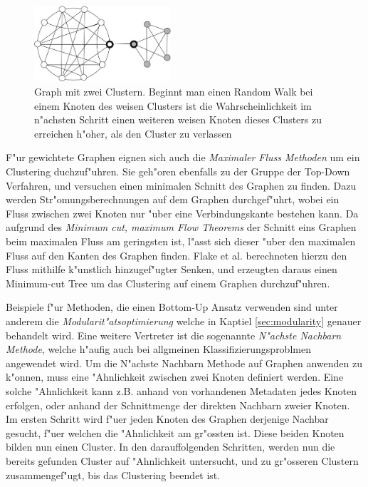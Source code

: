 \documentclass[journal]{vgtc}
\begin{document}
    \begin{figure}[h]
    \centering
    \includegraphics[width=2in]{images/random_walk}
    \caption{\label{fig:random_walk} Graph mit zwei Clustern. Beginnt man einen Random Walk bei einem Knoten des weisen Clusters
	      ist die Wahrscheinlichkeit im n"achsten Schritt einen weiteren weisen Knoten dieses Clusters zu erreichen h"oher,
	      als den Cluster zu verlassen \cite{Schaeffer}}
    \end{figure}
    
  F"ur gewichtete Graphen eignen sich auch die \emph{Maximaler Fluss Methoden} um ein Clustering duchzuf"uhren. Sie
  geh"oren ebenfalls zu der Gruppe der Top-Down Verfahren, und versuchen einen minimalen Schnitt \cite{Schaeffer} des Graphen zu finden. 
  Dazu werden Str"omungsberechnungen auf dem Graphen durchgef"uhrt, wobei ein Fluss zwischen zwei Knoten nur "uber eine Verbindungskante bestehen kann.
  Da aufgrund des \emph{Minimum cut, maximum Flow Theorems} der Schnitt eins Graphen beim maximalen Fluss am geringsten ist, l"asst sich dieser "uber
  den maximalen Fluss auf den Kanten des Graphen finden. Flake et al.\cite{flake} berechneten hierzu den Fluss mithilfe k"unstlich hinzugef"ugter
  Senken, und erzeugten daraus einen Minimum-cut Tree\cite{minimum_cut_tree} um das Clustering auf einem Graphen durchzuf"uhren.
  
  Beispiele f"ur Methoden, die einen Bottom-Up Ansatz verwenden sind unter anderem die \emph{Modularit"atsoptimierung} welche
  in Kaptiel \ref{sec:modularity} genauer behandelt wird. Eine weitere Vertreter ist die sogenannte \emph{N"achste Nachbarn Methode}\cite{Schaeffer}, welche
  h"aufig auch bei allgmeinen Klassifizierungsproblmen angewendet wird. Um die N"achste Nachbarn Methode auf Graphen anwenden
  zu k"onnen, muss eine "Ahnlichkeit zwischen zwei Knoten definiert werden. Eine solche "Ahnlichkeit
  kann z.B. anhand von vorhandenen Metadaten jedes Knoten erfolgen, oder anhand der Schnittmenge der direkten Nachbarn zweier
  Knoten. Im ersten Schritt wird f"uer jeden Knoten des Graphen derjenige Nachbar gesucht, f"uer welchen die "Ahnlichkeit am gr"ossten ist.
  Diese beiden Knoten bilden nun einen Cluster. In den darauffolgenden Schritten, werden nun die bereits gefunden Cluster auf "Ahnlichkeit
  untersucht, und zu gr"osseren Clustern zusammengef"ugt, bis das Clustering beendet ist.
  
\end{document}
